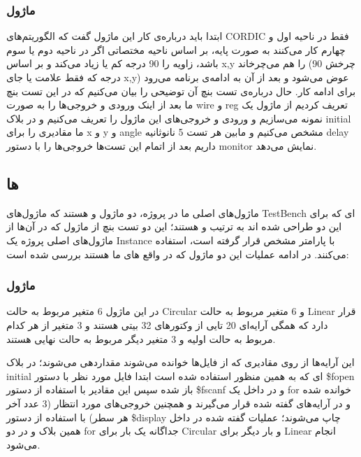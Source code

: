 \documentclass[12pt,titlepage,a4page , tikz , multi,table , svgnames,xcdraw]{article}
\begin{document}
\subsubsection{ماژول }


ابتدا باید درباره‌ی کار این ماژول گفت که الگوریتم‌های CORDIC فقط در ناحیه اول و چهارم کار می‌کنند به صورت پایه،  بر اساس ناحیه مختصاتی اگر در ناحیه دوم یا سوم باشد،  زاویه را 90  درجه کم یا زیاد می‌کند و بر اساس  x,y را هم می‌چرخاند (چرخش 90 درجه که فقط علامت یا جای x,y) عوض می‌شود و بعد از آن به ادامه‌ی برنامه می‌رود برای ادامه کار.
حال درباره‌ی تست بنچ آن توضیحی را بیان می‌کنیم که در این تست بنچ ما بعد از اینک ورودی و خروجی‌ها را به صورت wire  و reg  تعریف کردیم از ماژول   یک نمونه می‌سازیم و ورودی و خروجی‌های این ماژول را تعریف می‌کنیم  و در بلاک initial  ما مقادیری را برای x  و y  و angle  مشخص می‌کنیم و مابین هر تست 5 نانوثانیه delay  داریم بعد از اتمام این تست‌ها خروجی‌ها را با دستور monitor  نمایش می‌دهد.

\newpage

\subsection{  ها}

ماژول‌های اصلی ما در پروژه، دو ماژول  و  هستند که ماژول‌های TestBench ای که برای این دو طراحی شده اند به ترتیب   و   هستند؛ این دو تست بنچ از ماژول  که در آن‌ها از ماژول‌های اصلی پروژه یک Instance با پارامتر مشخص قرار گرفته است، استفاده می‌کنند. در ادامه عملیات این دو ماژول که در واقع  های ما هستند بررسی شده است:


\subsubsection{ماژول }


در این ماژول 6 متغیر مربوط به حالت Circular و 6 متغیر مربوط به حالت Linear قرار دارد که همگی آرایه‌ای 20 تایی از وکتورهای 32 بیتی هستند و 3 متغیر از هر کدام مربوط به حالت اولیه و 3 متغیر دیگر مربوط به حالت نهایی هستند.

این آرایه‌ها از روی مقادیری که از فایل‌ها خوانده می‌شوند مقداردهی می‌شوند؛ در بلاک initial ای که به همین منظور استفاده شده است ابتدا فایل مورد نظر با دستور \$fopen باز شده سپس این مقادیر با استفاده از دستور \$fscanf و در داخل یک for خوانده شده و در آرایه‌های گفته شده قرار می‌گیرند و همچنین خروجی‌های مورد انتظار (3 عدد آخر هر سطر) با استفاده از دستور \$display چاپ می‌شوند؛ عملیات گفته شده در داخل همین بلاک و در دو for جداگانه یک بار برای Circular و بار دیگر برای Linear انجام می‌شود.
\end{document}
